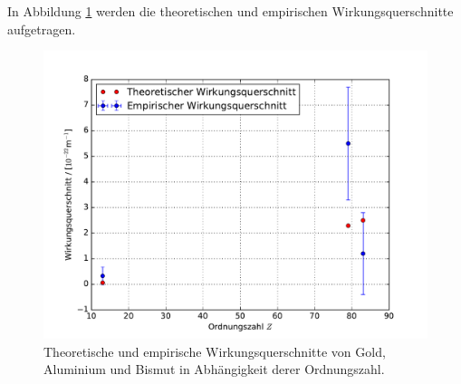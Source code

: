 In Abbildung \ref{fig:Z-WQ} werden die theoretischen und empirischen Wirkungsquerschnitte aufgetragen.

\begin{figure}[H]
  \centering
  \includegraphics[width=\textwidth]{Z-WQ.pdf}
  \caption{Theoretische und empirische Wirkungsquerschnitte von Gold, Aluminium und Bismut in Abhängigkeit derer Ordnungszahl.}
  \label{fig:Z-WQ}
\end{figure}
